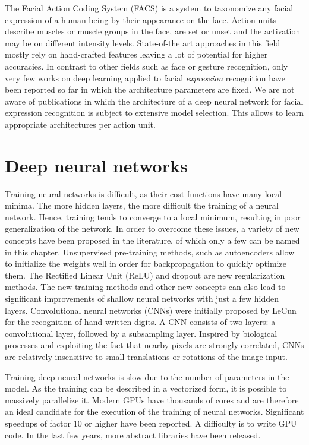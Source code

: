 \documentclass{ws-procs9x6}
\begin{document}
The Facial Action Coding System (FACS) \cite{FACS} is a system to taxonomize any facial expression of a human being by their appearance on the face. Action units describe muscles or muscle groups in the face, are set or unset and the activation may be on different intensity levels.
State-of-the art approaches in this field mostly rely on hand-crafted features leaving a lot of potential for higher accuracies. In contrast to other fields such as face or gesture recognition, only very few works on  deep learning applied to facial \textit{expression} recognition have been reported so far\cite{gudi} in which the architecture parameters are fixed. We are not aware of publications in which the architecture of a deep neural network for facial expression recognition is subject to extensive model selection. This allows to learn appropriate architectures per action unit.

\section{Deep neural networks}
Training neural networks is difficult, as their cost functions have many local minima. The more hidden layers, the more difficult the training of a neural network. Hence, training tends to converge to a local minimum, resulting in poor generalization of the network.
In order to overcome these issues, a variety of new concepts have been proposed in the literature, of which only a few can be named in this chapter. Unsupervised pre-training methods, such as autoencoders \cite{ng_tutorial} allow to initialize the weights well in order for backpropagation to quickly optimize them. The Rectified Linear Unit (ReLU) \cite{rectified} and dropout \cite{dropout_simple} are new regularization methods.
The new training methods and other new concepts can also lead to significant improvements of shallow neural networks with just a few hidden layers.
Convolutional neural networks (CNNs) were initially proposed by LeCun \cite{MNIST_LeNet} for the recognition of hand-written digits. A CNN consists of two layers: a convolutional layer, followed by a subsampling layer.
Inspired by biological processes and exploiting the fact that nearby pixels are strongly correlated, CNNs are relatively insensitive to small translations or rotations of the image input. 

Training deep neural networks is slow due to the number of parameters in the model. As the training can be described in a vectorized form, it is possible to massively parallelize it. Modern GPUs have thousands of cores and are therefore an ideal candidate for the execution of the training of neural networks. Significant speedups of factor 10 or higher\cite{tesla} have been reported.
A difficulty is to write GPU code. In the last few years, more abstract libraries have been released.
\end{document}
